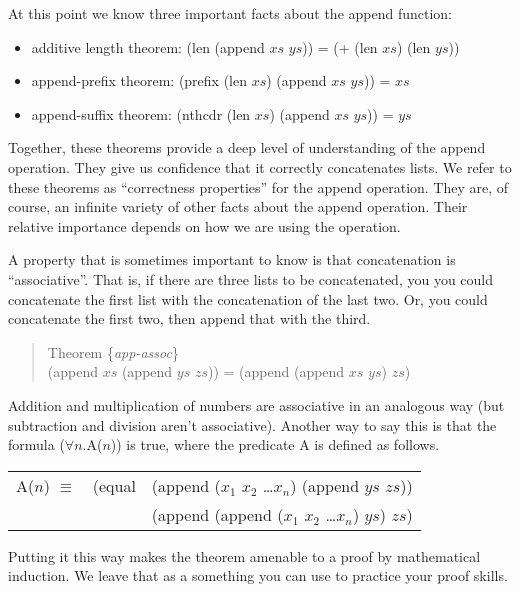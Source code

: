 At this point we know three important facts about the append function:
\begin{itemize}
\item additive length theorem: (len (append $xs$ $ys$)) = (+ (len $xs$) (len $ys$))
\item append-prefix theorem: (prefix (len $xs$) (append $xs$ $ys$)) = $xs$
\item append-suffix theorem: (nthcdr (len $xs$) (append $xs$ $ys$)) = $ys$
\end{itemize}

Together, these theorems provide a deep level of understanding of the append operation. They give us confidence that it correctly concatenates lists. We refer to these theorems as ``correctness properties'' for the append operation. They are, of course, an infinite variety of other facts about the append operation. Their relative importance depends on how we are using the operation.

A property that is sometimes important to know is that concatenation is ``associative''. That is, if there are three lists to be concatenated, you you could concatenate the first list with the concatenation of the last two. Or, you could concatenate the first two, then append that with the third.

\begin{quote}
\label{app-assoc}
Theorem \{\emph{app-assoc}\} \\
(append $xs$ (append $ys$ $zs$)) = (append (append $xs$ $ys$) $zs$)
\end{quote}

Addition and multiplication of numbers are associative in an analogous way (but subtraction and division aren't associative). Another way to say this is that the formula ($\forall$$n$.A($n$)) is true, where the predicate A is defined as follows.

\begin{center}
\begin{tabular} {lll}
A($n$) $\equiv$  & (equal & (append ($x_1$ $x_2$ \dots $x_n$) (append $ys$ $zs$)) \\
                 &        & (append (append ($x_1$ $x_2$ \dots $x_n$) $ys$) $zs$) \\
\end{tabular}
\end{center}

Putting it this way makes the theorem amenable to a proof by mathematical induction. We leave that as a something you can use to practice your proof skills.


